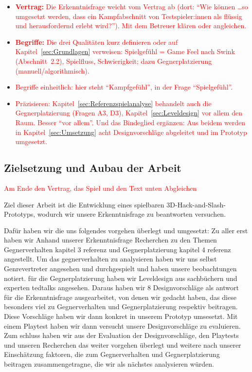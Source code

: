 \documentclass[../Main.tex]{subfiles}
\begin{document}
\begin{itemize}[leftmargin=1.5cm]
    \item \textcolor{red}{\textbf{Vertrag:} Die Erkenntnisfrage weicht vom Vertrag ab (dort: \enquote{Wie können \ldots so umgesetzt werden, dass ein Kampfabschnitt von Testspieler:innen als flüssig und herausfordernd erlebt wird?}). Mit dem Betreuer klären oder angleichen.}
    \item \textcolor{red}{\textbf{Begriffe:} Die drei Qualitäten kurz definieren oder auf Kapitel~\ref{sec:Grundlagen} verweisen: Spielgefühl = Game Feel nach Swink (Abschnitt~2.2), Spielfluss, Schwierigkeit; dazu Gegnerplatzierung (manuell/algorithmisch).}
    \item \textcolor{red}{Begriffe einheitlich: hier steht \enquote{Kampfgefühl}, in der Frage \enquote{Spielgefühl}.}
    \item \textcolor{red}{Präzisieren: Kapitel~\ref{sec:Referenzspielanalyse} behandelt auch die Gegnerplatzierung (Fragen A3, D3), Kapitel~\ref{sec:Leveldesign} vor allem den Raum. Besser \enquote{vor allem}. Und das Bindeglied ergänzen: Aus beidem werden in Kapitel~\ref{sec:Umsetzung} acht Designvorschläge abgeleitet und im Prototyp umgesetzt.}
\end{itemize}

\subsection{Zielsetzung und Aubau der Arbeit}

\textcolor{red}{Am Ende den Vertrag, das Spiel und den Text unten Abgleichen}

Ziel dieser Arbeit ist die Entwicklung eines spielbaren 3D-Hack-and-Slash-Prototyps, wodurch wir unsere Erkenntnisfrage zu beantworten versuchen.

Dafür haben wir die uns folgendes vorgehen überlegt und umgesetzt: Zu aller erst haben wir Anhand unserer Erkenntnisfrage Recherchen zu den Themen Gegnerverhalten kapitel 3 referenz und Gegnerplatzierung kapitel 4 referenz angestellt. Um das gegnerverhalten zu analysieren haben wir uns selbst Genrevertreter angesehen und durchgespielt und haben unsere beobachtungen notiert. für die Gegnerplatzierung haben wir Leveldesign aus sachbüchern und experten tedtalks angesehen. Daraus haben wir 8 Designvorschläge als antwort für die Erkenntnisfrage ausgearbeitet, von denen wir gedacht haben, das diese besonders viel zu Gegnerverhalten und Gegnerplatzierung respektiv beitragen. Diese Vorschläge haben wir dann konkret in unserem Prototyp umsesetzt. Mit einem Playtest haben wir dann versucht unsere Designvorschläge zu evaluieren. Zum schluss haben wir aus der Evaluation der Designvorschläge, den Playtests und unseren Recherchen das weiter vorgehen überlegt und weitere nach unserer Einschätzung faktoren, die zum Gegnerverhalten und Gegnerplatzierung beitragen zusammengetragne, die wir als nächstes analysieren würden.
\end{document}
